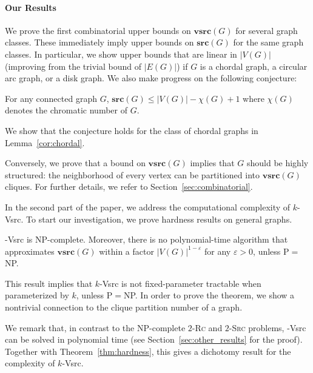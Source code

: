 \documentclass[letter,runningheads,envcountsame,envcountsect]{llncs}
\newcommand{\vsrc}{\mathbf{vsrc}}
\newcommand{\src}{\mathbf{src}}
\newcommand{\tvsrc}{{\sc 3-Vsrc}}
\newcommand{\twovsrc}{{\sc 2-Vsrc}}
\newcommand{\kvsrc}{{\sc $k$-Vsrc}}
\begin{document}
\paragraph{Our Results}
We prove the first combinatorial upper bounds on $\vsrc(G)$ for several graph classes. These immediately imply upper bounds on $\src(G)$ for the same graph classes. In particular, we show upper bounds that are linear in $|V(G)|$ (improving from the trivial bound of $|E(G)|$) if $G$ is a chordal graph, a circular arc graph, or a disk graph.
We also make progress on the following conjecture:
\begin{conjecture}
For any connected graph $G$, $\src(G)\le |V(G)|-\chi(G)+1$ where $\chi(G)$ denotes the chromatic number of $G$.	
\end{conjecture}
We show that the conjecture holds for the class of chordal graphs in Lemma~\ref{cor:chordal}.

Conversely, we prove that a bound on $\vsrc(G)$ implies that $G$ should be highly structured: the neighborhood of every vertex can be partitioned into $\vsrc(G)$ cliques. For further details, we refer to Section~\ref{sec:combinatorial}.

In the second part of the paper, we address the computational complexity of {\kvsrc}. To start our investigation, we prove hardness results on general graphs.
\begin{theorem} \label{thm:hardness}
{\tvsrc} is NP-complete. Moreover, there is no polynomial-time algorithm that approximates $\vsrc(G)$ within a factor $|V(G)|^{1-\varepsilon}$ for any $\varepsilon >0$, unless P$=$NP.
\end{theorem}
%
This result implies that {\kvsrc} is not fixed-parameter tractable when parameterized by $k$, unless P$=$NP. In order to prove the theorem, we show a nontrivial connection to the clique partition number of a graph. 

We remark that, in contrast to the NP-complete \textsc{$2$-Rc} and \textsc{$2$-Src} problems, {\twovsrc} can be solved in polynomial time (see Section~\ref{sec:other_results} for the proof). Together with Theorem~\ref{thm:hardness}, this gives a dichotomy result for the complexity of {\kvsrc}.
\end{document}
